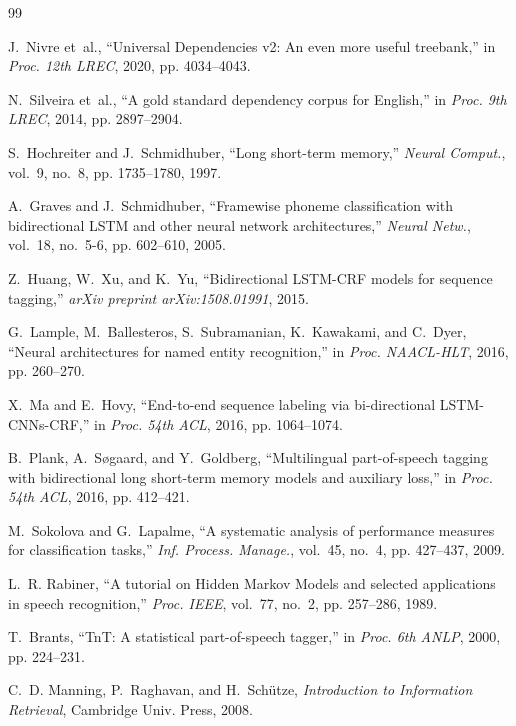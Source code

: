 \documentclass[conference]{IEEEtran}
\begin{document}

\begin{thebibliography}{99}

J.~Nivre et~al., ``Universal Dependencies v2: An even more useful treebank,'' in \emph{Proc. 12th LREC}, 2020, pp. 4034--4043.

N.~Silveira et~al., ``A gold standard dependency corpus for English,'' in \emph{Proc. 9th LREC}, 2014, pp. 2897--2904.

S.~Hochreiter and J.~Schmidhuber, ``Long short-term memory,'' \emph{Neural Comput.}, vol.~9, no.~8, pp. 1735--1780, 1997.

A.~Graves and J.~Schmidhuber, ``Framewise phoneme classification with bidirectional LSTM and other neural network architectures,'' \emph{Neural Netw.}, vol.~18, no.~5-6, pp. 602--610, 2005.

Z.~Huang, W.~Xu, and K.~Yu, ``Bidirectional LSTM-CRF models for sequence tagging,'' \emph{arXiv preprint arXiv:1508.01991}, 2015.

G.~Lample, M.~Ballesteros, S.~Subramanian, K.~Kawakami, and C.~Dyer, ``Neural architectures for named entity recognition,'' in \emph{Proc. NAACL-HLT}, 2016, pp. 260--270.

X.~Ma and E.~Hovy, ``End-to-end sequence labeling via bi-directional LSTM-CNNs-CRF,'' in \emph{Proc. 54th ACL}, 2016, pp. 1064--1074.

B.~Plank, A.~S{\o}gaard, and Y.~Goldberg, ``Multilingual part-of-speech tagging with bidirectional long short-term memory models and auxiliary loss,'' in \emph{Proc. 54th ACL}, 2016, pp. 412--421.

M.~Sokolova and G.~Lapalme, ``A systematic analysis of performance measures for classification tasks,'' \emph{Inf. Process. Manage.}, vol.~45, no.~4, pp. 427--437, 2009.

L.~R. Rabiner, ``A tutorial on Hidden Markov Models and selected applications in speech recognition,'' \emph{Proc. IEEE}, vol.~77, no.~2, pp. 257--286, 1989.

T.~Brants, ``TnT: A statistical part-of-speech tagger,'' in \emph{Proc. 6th ANLP}, 2000, pp. 224--231.

C.~D. Manning, P.~Raghavan, and H.~Sch{\"u}tze, \emph{Introduction to Information Retrieval}, Cambridge Univ. Press, 2008.

\end{thebibliography}
\end{document}
